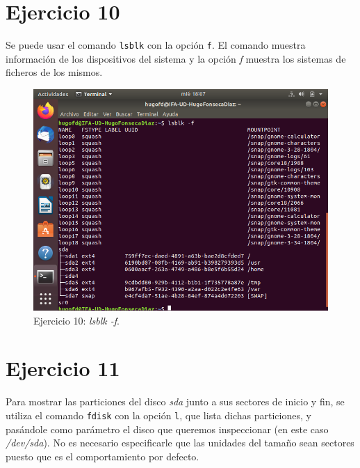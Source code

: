 \documentclass[11pt]{article}
\begin{document}
\section{Ejercicio 10}
Se puede usar el comando \verb|lsblk| con la opción \verb|f|. El comando muestra información de los dispositivos del sistema y la opción \textit{f} muestra los sistemas de ficheros de los mismos.

\begin{figure}[H]
    \caption{Ejercicio 10: \textit{lsblk -f}.}
  \centering
  \includegraphics[scale=0.7]{e10.png}
\end{figure}

\section{Ejercicio 11}
Para mostrar las particiones del disco \textit{sda} junto a sus sectores de inicio y fin, se utiliza el comando \verb|fdisk| con la opción \verb|l|, que lista dichas particiones, y pasándole como parámetro el disco que queremos inspeccionar (en este caso \textit{/dev/sda}). No es necesario especificarle que las unidades del tamaño sean sectores puesto que es el comportamiento por defecto.
\end{document}
